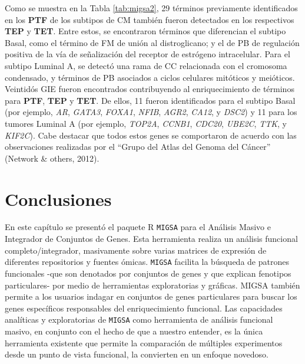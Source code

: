 \documentclass[12pt,twoside]{reedthesis}
\begin{document}
Como se muestra en la Tabla \ref{tab:migsa2}, 29 términos previamente identificados en los \textbf{PTF} de los subtipos de CM también fueron detectados en los respectivos \textbf{TEP} y \textbf{TET}. Entre estos, se encontraron términos que diferencian el subtipo Basal, como el término de FM de unión al distroglicano; y el de PB de regulación positiva de la vía de señalización del receptor de estrógeno intracelular. Para el subtipo Luminal A, se detectó una rama de CC relacionada con el cromosoma condensado, y términos de PB asociados a ciclos celulares mitóticos y meióticos. Veintidós GIE fueron encontrados contribuyendo al enriquecimiento de términos para \textbf{PTF}, \textbf{TEP} y \textbf{TET}. De ellos, 11 fueron identificados para el subtipo Basal (por ejemplo, \emph{AR}, \emph{GATA3}, \emph{FOXA1}, \emph{NFIB}, \emph{AGR2}, \emph{CA12}, y \emph{DSC2}) y 11 para los tumores Luminal A (por ejemplo, \emph{TOP2A}, \emph{CCNB1}, \emph{CDC20}, \emph{UBE2C}, \emph{TTK}, y \emph{KIF2C}). Cabe destacar que todos estos genes se comportaron de acuerdo con las observaciones realizadas por el ``Grupo del Atlas del Genoma del Cáncer'' (Network \& others, 2012).

\hypertarget{conclusiones-1}{%
\section{Conclusiones}\label{conclusiones-1}}

\par

En este capítulo se presentó el paquete R \texttt{MIGSA} para el Análisis Masivo e Integrador de Conjuntos de Genes. Esta herramienta realiza un análisis funcional completo/integrador, masivamente sobre varias matrices de expresión de diferentes repositorios y fuentes ómicas. \texttt{MIGSA} facilita la búsqueda de patrones funcionales -que son denotados por conjuntos de genes y que explican fenotipos particulares- por medio de herramientas exploratorias y gráficas. MIGSA también permite a los usuarios indagar en conjuntos de genes particulares para buscar los genes específicos responsables del enriquecimiento funcional. Las capacidades analíticas y exploratorias de \texttt{MIGSA} como herramienta de análisis funcional masivo, en conjunto con el hecho de que a nuestro entender, es la única herramienta existente que permite la comparación de múltiples experimentos desde un punto de vista funcional, la convierten en un enfoque novedoso.

\par
\end{document}
